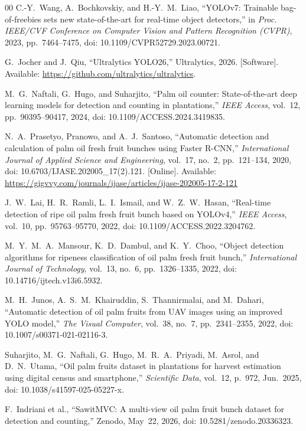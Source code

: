 \documentclass[conference,a4paper]{IEEEtran}
\begin{document}
\begin{thebibliography}{00}
C.-Y.~Wang, A.~Bochkovskiy, and H.-Y.~M.~Liao,
``YOLOv7: Trainable bag-of-freebies sets new state-of-the-art for real-time
object detectors,''
in \textit{Proc. IEEE/CVF Conference on Computer Vision and Pattern
Recognition (CVPR)}, 2023, pp.~7464--7475,
doi: 10.1109/CVPR52729.2023.00721.

G.~Jocher and J.~Qiu,
``Ultralytics YOLO26,'' Ultralytics, 2026. [Software].
Available: \url{https://github.com/ultralytics/ultralytics}.

M.~G.~Naftali, G.~Hugo, and Suharjito,
``Palm oil counter: State-of-the-art deep learning models for detection and
counting in plantations,''
\textit{IEEE Access}, vol.~12, pp.~90395--90417, 2024,
doi: 10.1109/ACCESS.2024.3419835.

N.~A.~Prasetyo, Pranowo, and A.~J.~Santoso,
``Automatic detection and calculation of palm oil fresh fruit bunches using
Faster R-CNN,''
\textit{International Journal of Applied Science and Engineering}, vol.~17,
no.~2, pp.~121--134, 2020, doi: 10.6703/IJASE.202005\_17(2).121. [Online]. Available:
\url{https://gigvvy.com/journals/ijase/articles/ijase-202005-17-2-121}

J.~W.~Lai, H.~R.~Ramli, L.~I.~Ismail, and W.~Z.~W.~Hasan,
``Real-time detection of ripe oil palm fresh fruit bunch based on YOLOv4,''
\textit{IEEE Access}, vol.~10, pp.~95763--95770, 2022,
doi: 10.1109/ACCESS.2022.3204762.

M.~Y.~M.~A.~Mansour, K.~D.~Dambul, and K.~Y.~Choo,
``Object detection algorithms for ripeness classification of oil palm fresh
fruit bunch,''
\textit{International Journal of Technology}, vol.~13, no.~6,
pp.~1326--1335, 2022, doi: 10.14716/ijtech.v13i6.5932.

M.~H.~Junos, A.~S.~M.~Khairuddin, S.~Thannirmalai, and M.~Dahari,
``Automatic detection of oil palm fruits from UAV images using an improved
YOLO model,''
\textit{The Visual Computer}, vol.~38, no.~7, pp.~2341--2355, 2022,
doi: 10.1007/s00371-021-02116-3.

Suharjito, M.~G.~Naftali, G.~Hugo, M.~R.~A.~Priyadi, M.~Asrol, and
D.~N.~Utama,
``Oil palm fruits dataset in plantations for harvest estimation using digital
census and smartphone,''
\textit{Scientific Data}, vol.~12, p.~972, Jun.~2025,
doi: 10.1038/s41597-025-05227-x.

F.~Indriani et al.,
``SawitMVC: A multi-view oil palm fruit bunch dataset for detection and counting,'' Zenodo, May~22, 2026,
doi: 10.5281/zenodo.20336323.


\end{thebibliography}
\end{document}
